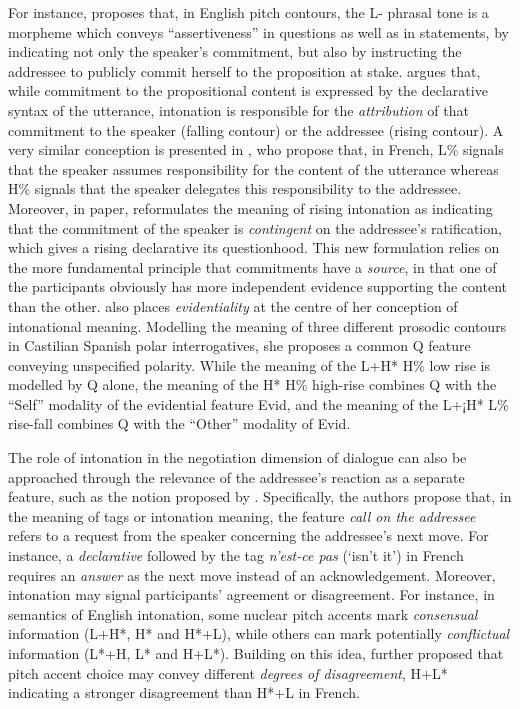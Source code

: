 \documentclass[output=paper,colorlinks,citecolor=brown]{langscibook}
\begin{document}
For instance, \citet{bartels99} proposes that, in English pitch contours, the L- phrasal tone is a morpheme which conveys ``assertiveness'' in questions as well as in statements, by indicating not only the speaker's commitment, but also by instructing the addressee to publicly commit herself to the proposition at stake. \citet{gunlogson2003} argues that, while commitment to the propositional content is expressed by the declarative syntax of the utterance, intonation is responsible for the \textit{attribution} of that commitment to the speaker (falling contour) or the addressee (rising contour). A very similar conception is presented in \citet{Portes2015IsIM}, who propose that, in French, L\% signals that the speaker assumes responsibility for the content of the utterance whereas H\% signals that the speaker delegates this responsibility to the addressee. Moreover, in \citeyear[her][]{gunlogson_question_2008} paper, \citeauthor{gunlogson_question_2008} reformulates the meaning of rising intonation as indicating that the commitment of the speaker is \textit{contingent} on the addressee's ratification, which gives a rising declarative its questionhood. This new formulation relies on the more fundamental principle that commitments have a \textit{source}, in that one of the participants obviously has more independent evidence supporting the content than the other. \citet{escandell-vidal_intonation_2017} also places \textit{evidentiality} at the centre of her conception of intonational meaning. Modelling the meaning of three different prosodic contours in Castilian Spanish polar interrogatives, she proposes a common Q feature conveying unspecified polarity. While the meaning of the L+H* H\% low rise is modelled by Q alone, the meaning of the H* H\% high-rise combines Q with the ``Self'' modality of the evidential feature Evid, and the meaning of the L+¡H* L\% rise-fall combines Q with the ``Other'' modality of Evid.

The role of intonation in the negotiation dimension of dialogue can also be approached through the relevance of the addressee's reaction as a separate feature, such as the notion proposed by \citet{beymar2007, beyssademar2006}. Specifically, the authors propose that, in the meaning of tags or intonation meaning, the feature \textit{call on the addressee} refers to a request from the speaker concerning the addressee's next move. For instance, a \textit{declarative} followed by the tag \textit{n'est-ce pas} (`isn't it') in French requires an \textit{answer} as the next move instead of an acknowledgement. Moreover, intonation may signal participants' agreement or disagreement. For instance, in  semantics of English intonation, some nuclear pitch accents mark \textit{consensual} information (L+H*, H* and H*+L), while others can mark potentially \textit{conflictual} information (L*+H, L* and H+L*). Building on this idea, \citet{Portes2015IsIM} further proposed that pitch accent choice may convey different \textit{degrees of disagreement}, H+L* indicating a stronger disagreement than H*+L in French.
\end{document}

